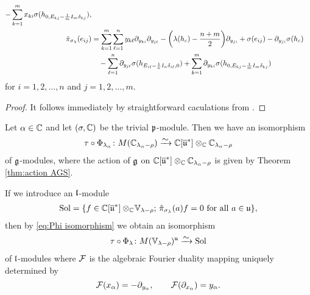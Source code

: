 \begin{theorem}
\begin{enumerate}
\begin{align}
\begin{aligned}
     - \sum_{k=1}^m x_{ki} \sigma(h_{0,E_{kj}-{1 \over m}I_m \delta_{kj}}),  \\
    \hat{\pi}_{\sigma_\lambda}(e_{ij})&= \sum_{k=1}^m \sum_{\ell=1}^n y_{k\ell} \partial_{y_{ki}} \partial_{y_{j\ell}} - \bigg(\lambda(h_c)-  {n+m \over 2}\bigg) \partial_{y_{ji}} + \sigma(e_{ij}) - \partial_{y_{ji}} \sigma(h_c)
    \\ &\quad - \sum_{\ell=1}^n \partial_{y_{j\ell}} \sigma(h_{E_{i\ell}-{1\over n}I_n \delta_{i \ell},0})
     + \sum_{k=1}^m \partial_{y_{ki}} \sigma(h_{0,E_{kj}-{1 \over m}I_m \delta_{kj}})
  \end{aligned}
\end{align}
for $i=1,2,\dots,n$ and $j=1,2,\dots,m$.
\end{enumerate}
\end{theorem}

\begin{proof}
It follows immediately by straightforward caculations from \cite{krizka_algebraic_2017}.
\end{proof}


Let $\alpha \in \mathbb{C}$ and let $(\sigma,\mathbb{C})$ be the trivial $\mathfrak{p}$-module. Then we have an isomorphism
\begin{align}\label{eq:Phi isomorphism}
  \tau \circ \Phi_{\lambda_\alpha} \colon M(\C_{\lambda_\alpha-\rho}) \riso \C[\widebar{\mfrak{u}}^*] \otimes_\C \C_{\lambda_\alpha-\rho}
\end{align}
of $\mathfrak{g}$-modules, where the action of $\mathfrak{g}$ on $\mathbb{C}[\overline{\mathfrak{u}}^*] \otimes_{\mathbb{C}} \mathbb{C}_{\lambda_\alpha-\rho}$ is given by Theorem \ref{thm:action AGS}.
\medskip

If we introduce an $\mathfrak{l}$-module
\begin{align}
  \Sol = \{f \in \C[\widebar{\mfrak{u}}^*] \otimes_\C \!\mathbb{V}_{\lambda-\rho};\, \hat{\pi}_{\sigma_\lambda}(a)f=0\ \text{for all}\ a \in \mfrak{u}\},
\end{align}
then by \eqref{eq:Phi isomorphism} we obtain an isomorphism
\begin{align}
  \tau \circ \Phi_\lambda \colon M(\mathbb{V}_{\lambda-\rho})^\mfrak{u} \riso \Sol
\end{align}
of $\mathfrak{l}$-modules where $\mathcal{F}$ is the algebraic Fourier duality mapping uniquely determined by 
\begin{equation*}
  \mathcal{F}(x_\alpha) = -\partial_{y_\alpha}, \qquad \mathcal{F}(\partial_{x_\alpha})= y_\alpha.
\end{equation*}

